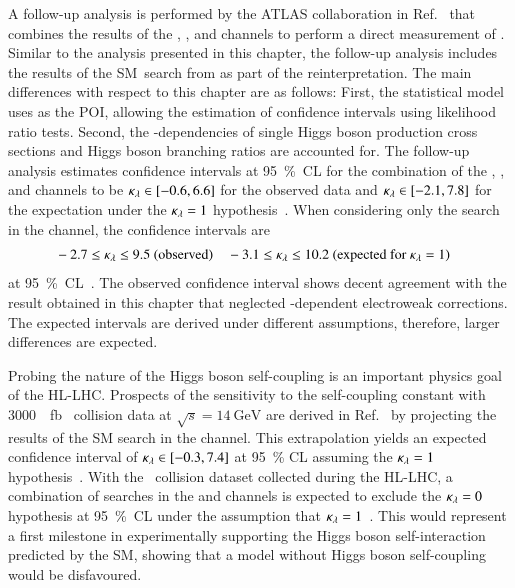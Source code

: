 A follow-up analysis is performed by the ATLAS collaboration in
Ref.~\cite{HDBS-2022-03} that combines the results of the \bbbb, \bbtautau, and
\bbyy channels to perform a direct measurement of \klambda.  Similar to the
analysis presented in this chapter, the follow-up analysis includes the results
of the SM~\HH search from  as part of the
reinterpretation. The main differences with respect to this chapter are as
follows: First, the statistical model uses \klambda as the POI, allowing the
estimation of \klambda confidence intervals using likelihood ratio tests.
Second, the \klambda-dependencies of single Higgs boson production cross
sections and Higgs boson branching ratios are accounted for.
The follow-up analysis estimates \klambda confidence intervals at
\SI{95}{\percent}~CL for the combination of the \bbbb, \bbtautau, and \bbyy
channels to be $\kappa_{\lambda} \in [-0.6, 6.6]$ for the observed data and
$\kappa_{\lambda} \in [-2.1, 7.8]$ for the expectation under the $\kappa_{\lambda} = 1$
hypothesis~\cite{HDBS-2022-03}. When considering only the search in the
\bbtautau channel, the \klambda confidence intervals are
\begin{align*}
  &-2.7 \leq \kappa_{\lambda} \leq 9.5 \text{ (observed)}
  &&-3.1 \leq \kappa_{\lambda} \leq 10.2 \text{ (expected for $\kappa_{\lambda} = 1$)}
\end{align*}
at \SI{95}{\percent}~CL~\cite{hepdata.h_hh_comb}.
The observed \klambda confidence interval shows decent agreement with the result
obtained in this chapter that neglected \klambda-dependent electroweak
corrections. The expected \klambda intervals are derived under different
assumptions, therefore, larger differences are expected.

Probing the nature of the Higgs boson self-coupling is an important physics goal
of the HL-LHC. Prospects of the sensitivity to the self-coupling constant with
\SI{3000}{\per\femto\barn} \pp~collision data at $\sqrt{s} = \SI{14}{\GeV}$ are
derived in Ref.~\cite{ATL-PHYS-PUB-2021-044} by projecting the results of the SM
\HH search in the \bbtautau channel. This extrapolation yields an expected
confidence interval of $\kappa_{\lambda} \in [-0.3, 7.4]$ at \SI{95}{\percent} CL
assuming the $\kappa_{\lambda} = 1$ hypothesis~\cite{ATL-PHYS-PUB-2021-044}. With the
\pp~collision dataset collected during the HL-LHC, a combination of searches in
the \bbtautau and \bbyy channels is expected to exclude the $\kappa_{\lambda} = 0$
hypothesis at \SI{95}{\percent}~CL under the assumption that
$\kappa_{\lambda} = 1$~\cite{ATL-PHYS-PUB-2022-005}. This would represent a first
milestone in experimentally supporting the Higgs boson self-interaction
predicted by the SM, showing that a model without Higgs boson self-coupling
would be disfavoured.

